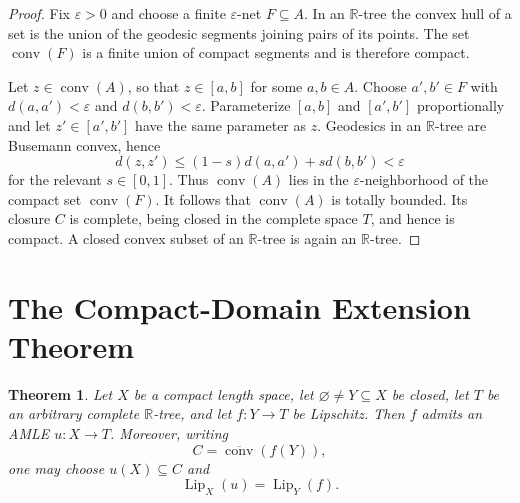 \documentclass[11pt]{article}
\newtheorem{theorem}{Theorem}
\newcommand{\R}{\mathbb R}
\newcommand{\Lip}{\operatorname{Lip}}
\newcommand{\conv}{\operatorname{conv}}
\begin{document}
\begin{proof}
Fix $\varepsilon>0$ and choose a finite $\varepsilon$-net
$F\subseteq A$.  In an $\R$-tree the convex hull of a set is the union of
the geodesic segments joining pairs of its points.  The set $\conv(F)$ is a
finite union of compact segments and is therefore compact.

Let $z\in\conv(A)$, so that $z\in[a,b]$ for some $a,b\in A$.  Choose
$a',b'\in F$ with $d(a,a')<\varepsilon$ and
$d(b,b')<\varepsilon$.  Parameterize $[a,b]$ and $[a',b']$ proportionally
and let $z'\in[a',b']$ have the same parameter as $z$.  Geodesics in an
$\R$-tree are Busemann convex, hence
\[
 d(z,z')\leq (1-s)d(a,a')+s d(b,b')<\varepsilon
\]
for the relevant $s\in[0,1]$.  Thus $\conv(A)$ lies in the
$\varepsilon$-neighborhood of the compact set $\conv(F)$.  It follows that
$\conv(A)$ is totally bounded.  Its closure $C$ is complete, being closed in
the complete space $T$, and hence is compact.  A closed convex subset of an
$\R$-tree is again an $\R$-tree.
\end{proof}

\section*{The Compact-Domain Extension Theorem}

\begin{theorem}\label{thm:main}
Let $X$ be a compact length space, let $\varnothing\neq Y\subseteq X$ be
closed, let $T$ be an arbitrary complete $\R$-tree, and let
$f:Y\to T$ be Lipschitz.  Then $f$ admits an AMLE $u:X\to T$.
Moreover, writing
\[
 C=\overline{\conv}(f(Y)),
\]
one may choose $u(X)\subseteq C$ and
\[
 \Lip_X(u)=\Lip_Y(f).
\]
\end{theorem}
\end{document}
